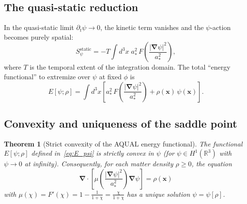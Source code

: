\documentclass[12pt,a4paper]{article}
\newtheorem{theorem}{Theorem}
\theoremstyle{definition}
\theoremstyle{remark}
\newcommand{\grad}{\boldsymbol{\nabla}}
\begin{document}
\subsection{The quasi-static reduction}

In the quasi-static limit $\partial_t\psi \to 0$, the kinetic term vanishes
and the $\psi$-action becomes purely spatial:
\begin{equation}
\label{eq:S_psi_static}
S_\psi^{\mathrm{static}} = -T \int d^3x\; a_*^2\,
F\!\left(\frac{|\grad\psi|^2}{a_*^2}\right),
\end{equation}
where $T$ is the temporal extent of the integration domain.  The total
``energy functional'' to extremize over $\psi$ at fixed $\phi$ is
\begin{equation}
\label{eq:E_psi}
E[\psi;\rho] = \int d^3x\left[
a_*^2\,F\!\left(\frac{|\grad\psi|^2}{a_*^2}\right) + \rho(\mathbf{x})\,\psi(\mathbf{x})
\right].
\end{equation}

\subsection{Convexity and uniqueness of the saddle point}

\begin{theorem}[Strict convexity of the AQUAL energy functional]
\label{thm:convexity}
The functional $E[\psi;\rho]$ defined in~\eqref{eq:E_psi} is strictly convex
in $\psi$ (for $\psi \in H^1(\mathbb{R}^3)$ with $\psi \to 0$ at infinity).
Consequently, for each matter density $\rho \geq 0$, the equation
\begin{equation}
\label{eq:psi_eom}
\grad\cdot\!\left[\mu\!\left(\frac{|\grad\psi|^2}{a_*^2}\right)\grad\psi\right]
= \rho(\mathbf{x})
\end{equation}
with $\mu(\chi) = F'(\chi) = 1 - \frac{1}{1+\chi} = \frac{\chi}{1+\chi}$
has a \emph{unique} solution $\psi = \psi[\rho]$.
\end{theorem}
\end{document}
